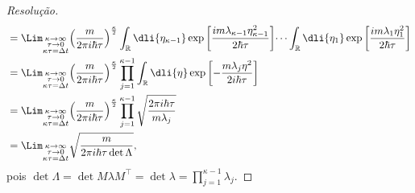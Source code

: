 \begin{proof}[Resolução]
\begin{align*}
                  &= \Lim_{\substack{\kappa \to \infty\\ \tau \to 0\\ \kappa \tau = \Delta t}}{\left(\frac{m}{2\pi i \hbar \tau}\right)^{\frac\kappa2}\int_{\mathbb{R}} \dli{\eta_{\kappa - 1}} \exp\left[\frac{im \lambda_{\kappa - 1} \eta_{\kappa - 1}^2}{2 \hbar \tau}\right]\dots \int_{\mathbb{R}} \dli{\eta_1} \exp\left[\frac{im \lambda_1 \eta_{1}^2}{2 \hbar \tau}\right]}\\
                  &= \Lim_{\substack{\kappa \to \infty\\ \tau \to 0\\ \kappa \tau = \Delta t}}{\left(\frac{m}{2\pi i \hbar \tau}\right)^{\frac\kappa2} \prod_{j = 1}^{\kappa - 1} \int_{\mathbb{R}} \dli{\eta} \exp\left[-\frac{m \lambda_j \eta^2}{2i \hbar \tau}\right]}\\
                  &= \Lim_{\substack{\kappa \to \infty\\ \tau \to 0\\ \kappa \tau = \Delta t}}{\left(\frac{m}{2\pi i \hbar \tau}\right)^{\frac\kappa2} \prod_{j = 1}^{\kappa - 1} \sqrt{\frac{2\pi i\hbar \tau}{m \lambda_j}}}\\
                  &= \Lim_{\substack{\kappa \to \infty\\ \tau \to 0\\ \kappa \tau = \Delta t}}{\sqrt{\frac{m}{2\pi i \hbar \tau \det \Lambda}}},
   \end{align*}
   pois \(\det{\Lambda} = \det{M \lambda M^\top} = \det{\lambda} = \prod_{j = 1}^{\kappa - 1}{\lambda_{j}}.\)


\end{proof}
